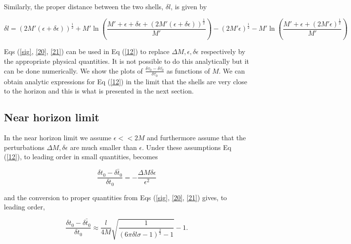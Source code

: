 \documentclass[aps,showpacs,twocolumn,floats,prd,superscriptaddress,nofootinbib]{revtex4-1}
\begin{document}
Similarly, the proper distance between the two shells, $\delta l$, is given by

\begin{equation}
	\delta l = (2M'(\epsilon + \delta \epsilon))^{\frac{1}{2}} + M' \ln \left(\frac{M' + \epsilon + \delta \epsilon + (2M'(\epsilon +\delta \epsilon))^{\frac{1}{2}}}{M'} \right) - (2M'\epsilon)^\frac{1}{2} - M' \ln \left( \frac{M' + \epsilon + (2M' \epsilon)^\frac{1}{2}}{M'} \right)	\label{21}
\end{equation}
	
Eqs (\ref{sig}, \ref{20}, \ref{21}) can be used in Eq (\ref{12}) to replace $\Delta M, \epsilon, \delta \epsilon$ respectively by the appropriate physical quantities. It is not possible to do this analytically but it can be done numerically. We show the plots of $\frac{\delta \tau_0 - \delta \bar{\tau_0}}{\delta \bar{\tau_0}}$ as functions of $M$. We can obtain analytic expressions for Eq (\ref{12}) in the limit that the shells are very close to the horizon and this is what is presented in the next section. 

\subsection{Near horizon limit}

In the near horizon limit we assume $\epsilon<< 2M$ and furthermore assume that the perturbations $\Delta M, \delta \epsilon$ are much smaller than $\epsilon$. Under these assumptions Eq (\ref{12}), to leading order in small quantities, becomes

\begin{equation}
	\frac{\delta t_0 - \bar{\delta t_0}}{\delta t_0} = - \frac{\Delta M \delta \epsilon}{\epsilon^2}
\end{equation}

and the conversion to proper quantities from Eqs (\ref{sig}, \ref{20}, \ref{21}) gives, to leading order, 

\begin{equation}
	\frac{\delta t_0 - \bar{\delta t_0}}{\delta t_0} \approx \frac{l}{4M} \sqrt{\frac{1}{(6 \pi \delta l \sigma - 1)^\frac{2}{3} -1 }} - 1.
\end{equation}

%
%
%
\end{document}
